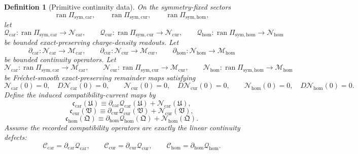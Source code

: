\documentclass[11pt]{article}
\newcommand{\RootTensor}{\mathfrak U}
\newcommand{\RootRelabel}{\mathfrak V}
\newcommand{\RootFree}{\mathfrak Q}
\newcommand{\TensorSymProj}{\Pi_{\mathrm{sym,car}}}
\newcommand{\CurSymProj}{\Pi_{\mathrm{sym,cur}}}
\newcommand{\HomSymProj}{\Pi_{\mathrm{sym,hom}}}
\newcommand{\TensorCompat}{\mathcal C_{\mathrm{car}}}
\newcommand{\CurCompat}{\mathcal C_{\mathrm{cur}}}
\newcommand{\HomCompat}{\mathcal C_{\mathrm{hom}}}
\newcommand{\TensorCurrent}{\mathfrak c_{\mathrm{car}}}
\newcommand{\CurCurrent}{\mathfrak c_{\mathrm{cur}}}
\newcommand{\HomCurrent}{\mathfrak c_{\mathrm{hom}}}
\newcommand{\TensorDensityClass}{\mathscr N_{\mathrm{car}}}
\newcommand{\CurDensityClass}{\mathscr N_{\mathrm{cur}}}
\newcommand{\HomDensityClass}{\mathscr N_{\mathrm{hom}}}
\newcommand{\TensorDensity}{\mathcal Q_{\mathrm{car}}}
\newcommand{\CurDensity}{\mathcal Q_{\mathrm{cur}}}
\newcommand{\HomDensity}{\mathcal Q_{\mathrm{hom}}}
\newcommand{\TensorCont}{\partial_{\mathrm{car}}}
\newcommand{\CurCont}{\partial_{\mathrm{cur}}}
\newcommand{\HomCont}{\partial_{\mathrm{hom}}}
\newcommand{\TensorRemainder}{\mathcal N_{\mathrm{car}}}
\newcommand{\CurRemainder}{\mathcal N_{\mathrm{cur}}}
\newcommand{\HomRemainder}{\mathcal N_{\mathrm{hom}}}
\newtheorem{definition}{Definition}
\begin{document}
\begin{definition}[Primitive continuity data]
\label{def:continuity_data}
On the symmetry-fixed sectors
\[
\operatorname{ran}\TensorSymProj,\qquad
\operatorname{ran}\CurSymProj,\qquad
\operatorname{ran}\HomSymProj,
\]
let
\[
\TensorDensity:\operatorname{ran}\TensorSymProj\to\TensorDensityClass,\qquad
\CurDensity:\operatorname{ran}\CurSymProj\to\CurDensityClass,\qquad
\HomDensity:\operatorname{ran}\HomSymProj\to\HomDensityClass
\]
be bounded exact-preserving charge-density readouts. Let
\[
\TensorCont:\TensorDensityClass\to\mathscr M_{\mathrm{car}},\qquad
\CurCont:\CurDensityClass\to\mathscr M_{\mathrm{cur}},\qquad
\HomCont:\HomDensityClass\to\mathscr M_{\mathrm{hom}}
\]
be bounded continuity operators. Let
\[
\TensorRemainder:\operatorname{ran}\TensorSymProj\to\mathscr M_{\mathrm{car}},\qquad
\CurRemainder:\operatorname{ran}\CurSymProj\to\mathscr M_{\mathrm{cur}},\qquad
\HomRemainder:\operatorname{ran}\HomSymProj\to\mathscr M_{\mathrm{hom}}
\]
be Fr\'echet-smooth exact-preserving remainder maps satisfying
\begin{equation}
\TensorRemainder(0)=0,\quad D\TensorRemainder(0)=0,
\qquad
\CurRemainder(0)=0,\quad D\CurRemainder(0)=0,
\qquad
\HomRemainder(0)=0,\quad D\HomRemainder(0)=0.
\label{eq:remainder_zero}
\end{equation}
Define the induced compatibility-current maps by
\begin{equation}
\TensorCurrent(\RootTensor)
\equiv
\TensorCont\TensorDensity(\RootTensor)+\TensorRemainder(\RootTensor),
\label{eq:car_current_from_cont}
\end{equation}
\begin{equation}
\CurCurrent(\RootRelabel)
\equiv
\CurCont\CurDensity(\RootRelabel)+\CurRemainder(\RootRelabel),
\label{eq:cur_current_from_cont}
\end{equation}
\begin{equation}
\HomCurrent(\RootFree)
\equiv
\HomCont\HomDensity(\RootFree)+\HomRemainder(\RootFree).
\label{eq:hom_current_from_cont}
\end{equation}
Assume the recorded compatibility operators are exactly the linear continuity defects:
\begin{equation}
\TensorCompat=\TensorCont\TensorDensity,
\qquad
\CurCompat=\CurCont\CurDensity,
\qquad
\HomCompat=\HomCont\HomDensity.
\label{eq:compat_factored}
\end{equation}
\end{definition}
\end{document}
